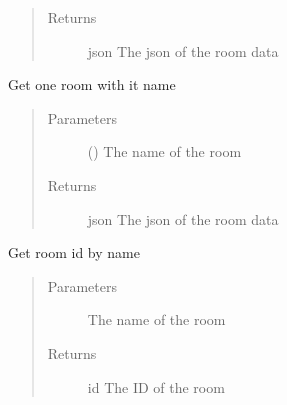 \documentclass[letterpaper,10pt,english]{sphinxmanual}
\begin{document}
\begin{fulllineitems}
\begin{fulllineitems}
\begin{quote}
\begin{description}
\item[{Returns}] \leavevmode
\sphinxAtStartPar
json \textendash{} The json of the room data

\end{description}\end{quote}

\end{fulllineitems}


\begin{fulllineitems}
\label{\detokenize{index:Api.Api.get_room_by_name}}
\sphinxAtStartPar
Get one room with it name
\begin{quote}\begin{description}
\item[{Parameters}] \leavevmode
\sphinxAtStartPar
{} () \textendash{} The name of the room

\item[{Returns}] \leavevmode
\sphinxAtStartPar
json \textendash{} The json of the room data

\end{description}\end{quote}

\end{fulllineitems}


\begin{fulllineitems}
\label{\detokenize{index:Api.Api.get_room_id_by_name}}
\sphinxAtStartPar
Get room id by name
\begin{quote}\begin{description}
\item[{Parameters}] \leavevmode
\sphinxAtStartPar
{} \textendash{} The name of the room

\item[{Returns}] \leavevmode
\sphinxAtStartPar
id \textendash{} The ID of the room


\end{description}
\end{quote}
\end{fulllineitems}
\end{fulllineitems}
\end{document}
